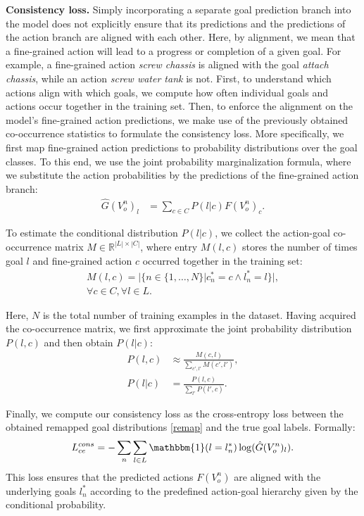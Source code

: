 \documentclass{article}
\begin{document}
\textbf{Consistency loss.} Simply incorporating a separate goal prediction branch into the model does not explicitly ensure that its predictions and the predictions of the action branch are aligned with each other. Here, by alignment, we mean that a fine-grained action will lead to a progress or completion of a given goal. For example, a fine-grained action \textit{screw chassis} is aligned with the goal \textit{attach chassis}, while an action \textit{screw water tank} is not. First, to understand which actions align with which goals, we compute how often individual goals and actions occur together in the training set. Then, to enforce the alignment on the model's fine-grained action predictions, we make use of the previously obtained co-occurrence statistics to formulate the consistency loss. 
More specifically, we first map fine-grained action predictions to probability distributions over the goal classes. To this end, we use the joint probability marginalization formula, where we substitute the action probabilities by the predictions of the fine-grained action branch:
\begin{align}
    \hat{G}(V_o^n)_{l} &= \sum_{c \in C}P(l|c)F(V_o^n)_{c} .
    \label{remap}
\end{align}

To estimate the conditional distribution $P(l|c)$, we collect the action-goal co-occurrence matrix $M \in \mathbb{R}^{|L|\times|C|}$, where entry $M(l,c)$ stores the number of times goal $l$ and fine-grained action $c$ occurred together in the training set:
\begin{align}
    M(l,c) = |\{n \in \{1, \dots, N\} | c^*_n = c \land l^*_n = l\}|, \\
    \nonumber\forall c \in C, \forall l \in L .
\end{align}

Here, $N$ is the total number of training examples in the dataset. Having acquired the co-occurrence matrix, we first approximate the joint probability distribution $P(l,c)$ and then obtain $P(l|c)$:
\begin{align}
    P(l,c) &\approx \frac{M(c,l)}{\sum_{c', l'}M(c',l')} , \\
    P(l|c) &= \frac{P(l,c)}{\sum_{l'}P(l',c)} .
\end{align}

Finally, we compute our consistency loss as the cross-entropy loss between the obtained remapped goal distributions \eqref{remap} and the true goal labels.
Formally:
\begin{align}
    L_{ce}^{cons} = -\sum_{n}\sum_{l \in L} \mathbbm{1}(l = l^*_n) \log(\hat{G}(V_o^n)_l) .  
\end{align}
This loss ensures that the predicted actions $F(V_o^n)$ are aligned with the underlying goals $l^*_n$ according to the predefined action-goal hierarchy given by the conditional probability.
\end{document}

